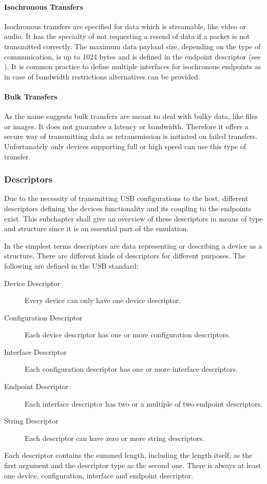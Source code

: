 \paragraph{Isochronous Transfers}

Isochronous transfers are specified for data which is streamable, like video or audio. It has the specialty of not requesting a resend of data if a 
packet is not transmitted correctly. The maximum data payload size, depending on the type of communication, is up to 1024 bytes and is defined in 
the endpoint descriptor (see ). It is common practice to define multiple interfaces for isochronous endpoints as in case of 
bandwidth restrictions alternatives can be provided.

\paragraph{Bulk Transfers}
As the name suggests bulk transfers are meant to deal with bulky data, like files or images. It does not guarantee a latency or 
bandwidth. Therefore it offers a secure way of transmitting data as retransmission is initiated on failed transfers. Unfortunately 
only devices supporting full or high speed can use this type of transfer. 

\subsubsection{Descriptors}
\label{sec:descriptors}
Due to the necessity of transmitting USB configurations to the host, different descriptors defining the devices functionality and its coupling to
the endpoints exist. This subchapter shall give an overview of these descriptors in means of type and structure since it is an essential part of the 
emulation. 

In the simplest terms descriptors are data representing or describing a device as a structure. There are different kinds of descriptors for different 
purposes. The following are defined in the USB standard:

\begin{description}
 \item[Device Descriptor] Every device can only have one device descriptor.
 \item[Configuration Descriptor] Each device descriptor has one or more configuration descriptors.
 \item[Interface Descriptor] Each configuration descriptor has one or more interface descriptors.
 \item[Endpoint  Descriptor] Each interface descriptor has two or a multiple of two endpoint descriptors.
 \item[String Descriptor] Each descriptor can have zero or more string descriptors.
\end{description}
Each descriptor contains the summed length, including the length itself, as the first argument and the descriptor type as the second one. There is 
always at least one device, configuration, interface and endpoint descriptor.

